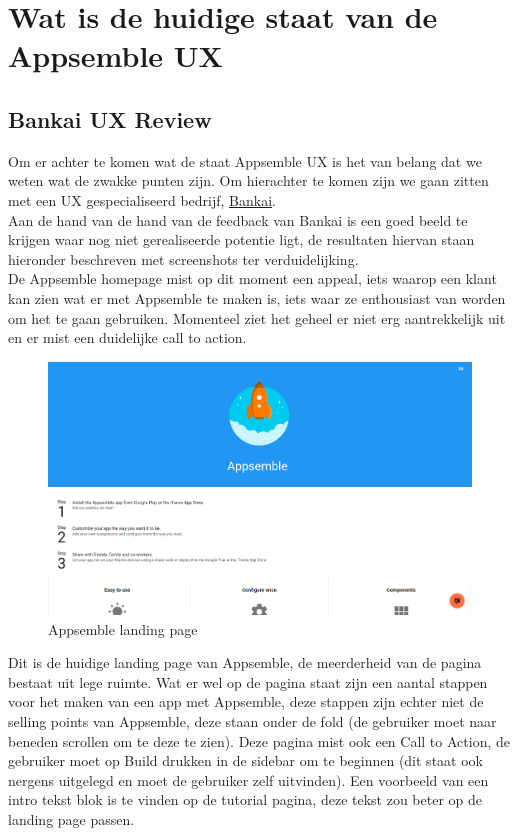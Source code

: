 \chapter{Wat is de huidige staat van de Appsemble UX}
\section{Bankai UX Review}
Om er achter te komen wat de staat Appsemble UX is het van belang dat we weten wat de zwakke punten zijn. Om hierachter te komen zijn we gaan zitten met een UX gespecialiseerd bedrijf, \href{http://www.bankai.eu/}{Bankai}\cite{bankai}.\\
\newline
%
Aan de hand van de hand van de feedback van Bankai is een goed beeld te krijgen waar nog niet gerealiseerde potentie ligt, de resultaten hiervan staan hieronder beschreven met screenshots ter verduidelijking.\\
\newline
%
De Appsemble homepage mist op dit moment een appeal, iets waarop een klant kan zien wat er met Appsemble te maken is, iets waar ze enthousiast van worden om het te gaan gebruiken. Momenteel ziet het geheel er niet erg aantrekkelijk uit en er mist een duidelijke call to action.\\
\newline
\begin{figure}[H]
	\includegraphics[width=\linewidth]{images/appsemble_landing_page}
	\caption{Appsemble landing page}
\end{figure}
Dit is de huidige landing page van Appsemble, de meerderheid van de pagina bestaat uit lege ruimte. Wat er wel op de pagina staat zijn een aantal stappen voor het maken van een app met Appsemble, deze stappen zijn echter niet de selling points van Appsemble, deze staan onder de fold (de gebruiker moet naar beneden scrollen om te deze te zien). Deze pagina mist ook een Call to Action, de gebruiker moet op Build drukken in de sidebar om te beginnen (dit staat ook nergens uitgelegd en moet de gebruiker zelf uitvinden).  Een voorbeeld van een intro tekst blok is te vinden op de tutorial pagina, deze tekst zou beter op de landing page passen.\\
